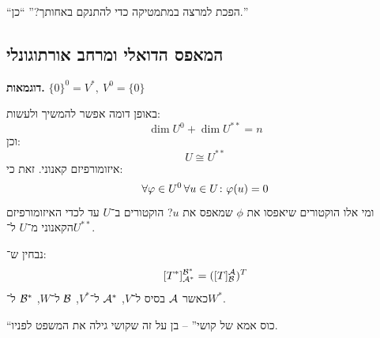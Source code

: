 \documentclass[]{../../../../tex/classes/styledArticle}
\begin{document}
	``הפכת למרצה במתמטיקה כדי להתנקם באחותך?'' ``כן.''
	
	\subsection{המאפס הדואלי ומרחב אורתוגונלי}
	
	\textbf{דוגמאות. } \hfil $\{0\}^0 = V^*, \ V^0 = \{0\}$
	

	באופן דומה אפשר להמשיך ולעשות: 
	\[ \dim U^0 + \dim U^{**} = n \]
	וכן: 
	\[ U \cong U^{**} \]
	איזומורפיזם קאנוני. זאת כי:
	\[ \forall \varphi \in U^0 \, \forall u \in U \colon \varphi(u) = 0 \]
	ומי אלו הוקטורים שיאפסו את $\phi$ שמאפס את $u$? הוקטורים ב־$U$ עד לכדי האיזומורפיזם הקאנוני מ־$U$ ל־$U^{**}$. 
	
	נבחין ש־: 
	\[ [T^*]^{\mathcal{B}^*}_{\mathcal{A}^*} = ([T]^{\mathcal{A}}_{\mathcal{B}})^T \]
	כאשר $\mathcal{A}$ בסיס ל־$V$, $\mathcal{A}^*$ ל־$V^*$, $\mathcal{B}$ ל־$W$, $\mathcal{B}^*$ ל־$W^*$. 
	
	``כוס אמא של קושי'' – בן על זה שקושי גילה את המשפט לפניו. 
	
	
	\ndoc
\end{document}

